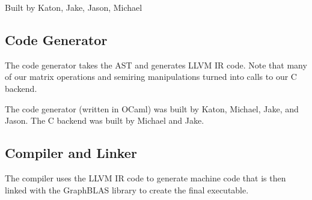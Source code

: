 Built by Katon, Jake, Jason, Michael

\subsection{Code Generator}
The code generator takes the AST and generates LLVM IR code. Note that many
of our matrix operations and semiring manipulations turned into calls to our
C backend.

The code generator (written in OCaml) was built by Katon, Michael, Jake, and
Jason. The C backend was built by Michael and Jake.

\subsection{Compiler and Linker}
The compiler uses the LLVM IR code to generate machine code that is then
linked with the GraphBLAS library to create the final executable.
